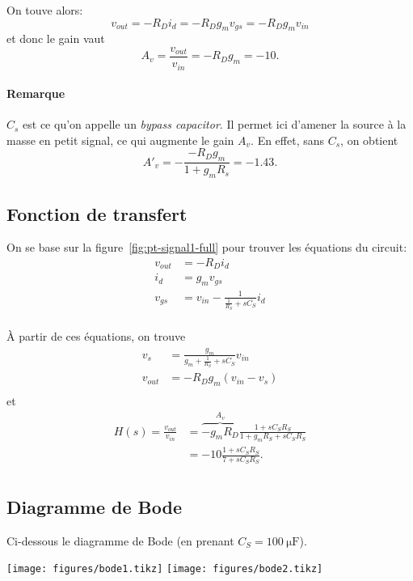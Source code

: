 \documentclass[frenchb,DIV=14]{scrartcl}
\begin{document}
On touve alors:
\[v_{out} = -R_D i_d = -R_D g_m v_{gs} = -R_D g_m v_{in}\]
et donc le gain vaut
\[A_v = \frac{v_{out}}{v_{in}} = -R_D g_m = -10.\]

\paragraph{Remarque}
$C_s$ est ce qu'on appelle un \emph{bypass capacitor}. Il permet ici d'amener
la source à la masse en petit signal, ce qui augmente le gain $A_v$. En effet,
sans $C_s$, on obtient
\[A'_v = -\frac{-R_D g_m}{1+g_m R_s} = -1.43.\]

\subsection*{Fonction de transfert}

On se base sur la figure~\ref{fig:pt-signal1-full} pour trouver les équations du circuit:
\begin{align*}
    v_{out} &= -R_D i_d \\
    i_d &= g_m v_{gs} \\
    v_{gs} &= v_{in} - \frac{1}{\frac{1}{R_S} + sC_S} i_d \\
\end{align*}

À partir de ces équations, on trouve
\begin{align*}
    v_s &= \frac{g_m}{g_m + \frac{1}{R_S} + s C_S} v_{in} \\
    v_{out} &= -R_D g_m \left(v_{in} - v_s\right) \\
\end{align*}
et
\begin{align*}
    H(s) = \frac{v_{out}}{v_{in}}
        &= \overbrace{-g_m R_D}^{A_v}\frac{1 + s C_S R_S}{1 + g_m R_S + s C_S R_S} \\
        &= -10\frac{1 + s C_S R_S}{7 + s C_S R_S}. \\
\end{align*}

\subsection*{Diagramme de Bode}

Ci-dessous le diagramme de Bode (en prenant $C_S = \SI{100}{\micro\farad}$).
\begin{center}
    \texttt{[image: figures/bode1.tikz]}
    \texttt{[image: figures/bode2.tikz]}
\end{center}
\end{document}
